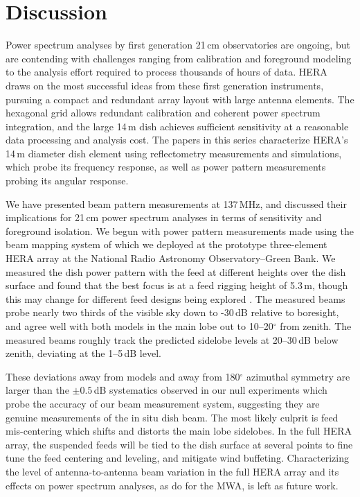 \documentclass{emulateapj}
\begin{document}
\section{Discussion}

Power spectrum analyses by first generation 21\,cm observatories are ongoing, but are contending with challenges ranging from calibration and foreground modeling to the analysis effort required to process thousands of hours of data. HERA draws on the most successful ideas from these first generation instruments, pursuing a compact and redundant array layout with large antenna elements. The hexagonal grid allows redundant calibration and coherent power spectrum integration, and the large 14\,m dish achieves sufficient sensitivity at a reasonable data processing and analysis cost. The papers in this series characterize HERA's 14\,m diameter dish element using reflectometry measurements and simulations, which probe its frequency response, as well as power pattern measurements probing its angular response. 

We have presented beam pattern measurements at 137\,MHz, and discussed their implications for 21\,cm power spectrum analyses in terms of sensitivity and foreground isolation. We begun with power pattern measurements made using the beam mapping system of \citet{neben15} which we deployed at the prototype three-element HERA array at the National Radio Astronomy Observatory--Green Bank. We measured the dish power pattern with the feed at different heights over the dish surface and found that the best focus is at a feed rigging height of 5.3\,m, though this may change for different feed designs being explored \citep{feedoptimizationmemo}. The measured beams probe nearly two thirds of the visible sky down to -30\,dB relative to boresight, and agree well with both models in the main lobe out to 10--20$^\circ$ from zenith. The measured beams roughly track the predicted sidelobe levels at 20--30\,dB below zenith, deviating at the 1--5\,dB level.

These deviations away from models and away from 180$^\circ$ azimuthal symmetry are larger than the $\pm0.5$\,dB systematics observed in our null experiments which probe the accuracy of our beam measurement system, suggesting they are genuine measurements of the in situ dish beam. The most likely culprit is feed mis-centering which shifts and distorts the main lobe sidelobes. In the full HERA array, the suspended feeds will be tied to the dish surface at several points to fine tune the feed centering and leveling, and mitigate wind buffeting. Characterizing the level of antenna-to-antenna beam variation in the full HERA array and its effects on power spectrum analyses, as \citet{neben16} do for the MWA, is left as future work.
\end{document}
